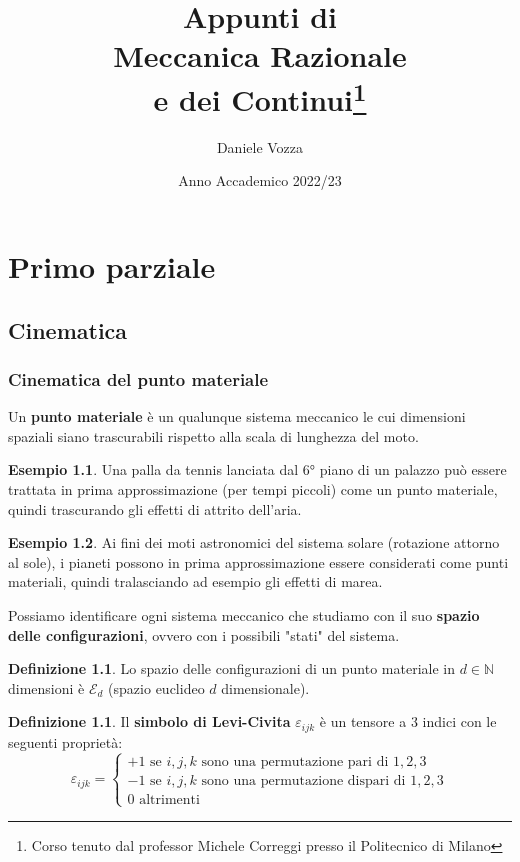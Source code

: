 \documentclass{book}
\title{Appunti di\\\Huge Meccanica Razionale\\e dei Continui\thanks{Corso tenuto dal professor Michele Correggi presso il Politecnico di Milano}}
\author{Daniele Vozza}
\date{Anno Accademico 2022/23}
\theoremstyle{plain}
\theoremstyle{plain}
\theoremstyle{plain}
\theoremstyle{plain}
\theoremstyle{plain}
\theoremstyle{definition}
\newtheorem{defi}{Definizione}[chapter]
\newtheorem*{defi*}{Definizione}
\theoremstyle{remark}
\theoremstyle{definition}
\newtheorem*{ex}{Esempio}
\begin{document}
\maketitle
\thispagestyle{empty}
\frontmatter
\hypersetup{hidelinks}
\tableofcontents
\mainmatter

\part{Primo parziale}

\chapter{Cinematica}

\section{Cinematica del punto materiale}

Un \textbf{punto materiale} è un qualunque sistema meccanico le cui dimensioni spaziali siano trascurabili rispetto alla scala di lunghezza del moto.

\begin{ex}
    Una palla da tennis lanciata dal 6° piano di un palazzo può essere trattata in prima approssimazione (per tempi piccoli) come un punto materiale, quindi trascurando gli effetti di attrito dell'aria.
\end{ex}

\begin{ex}
    Ai fini dei moti astronomici del sistema solare (rotazione attorno al sole), i pianeti possono in prima approssimazione essere considerati come punti materiali, quindi tralasciando ad esempio gli effetti di marea.
\end{ex}

\noindent Possiamo identificare ogni sistema meccanico che studiamo con il suo \textbf{spazio delle configurazioni}, ovvero con i possibili "stati" del sistema.

\begin{defi}
    Lo spazio delle configurazioni di un punto materiale in $d \in \mathbb{N}$  dimensioni è $\mathcal{E}_d$ (spazio euclideo $d$ dimensionale).
\end{defi}

\begin{defi*}
    Il \textbf{simbolo di Levi-Civita} $\varepsilon_{ijk}$ è un tensore a 3 indici con le seguenti proprietà:
    \begin{displaymath}
        \varepsilon_{ijk}=
    \begin{cases}
        +1 \text{ se } i, j, k \text{ sono una permutazione pari di } 1, 2, 3 \\
        -1 \text{ se } i, j, k \text{ sono una permutazione dispari di } 1, 2, 3 \\
        0 \text{ altrimenti}
    \end{cases}
    \end{displaymath}
\end{defi*}
\end{document}
